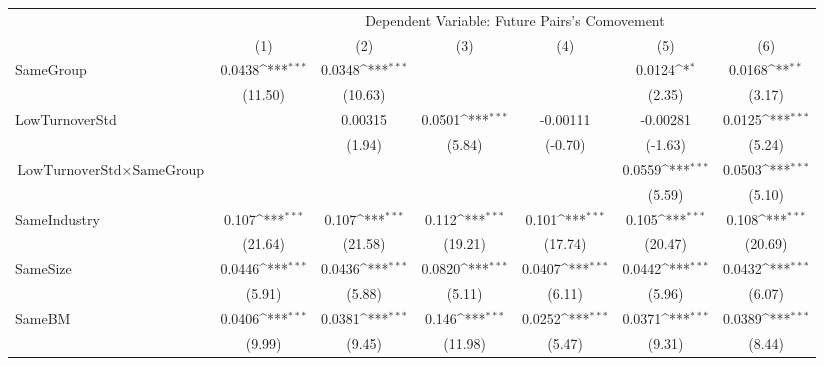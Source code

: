 {
\def\sym#1{\ifmmode^{#1}\else\(^{#1}\)\fi}
\begin{tabular}{l*{6}{c}}
\hline\hline
                &\multicolumn{6}{c}{Dependent Variable:  Future Pairs's Comovement}                                               \\\cmidrule(lr){2-7}
                &\multicolumn{1}{c}{(1)}         &\multicolumn{1}{c}{(2)}         &\multicolumn{1}{c}{(3)}         &\multicolumn{1}{c}{(4)}         &\multicolumn{1}{c}{(5)}         &\multicolumn{1}{c}{(6)}         \\
\hline
SameGroup       &   0.0438\sym{***}&   0.0348\sym{***}&                  &                  &   0.0124\sym{*}  &   0.0168\sym{**} \\
                &  (11.50)         &  (10.63)         &                  &                  &   (2.35)         &   (3.17)         \\
[1em]
LowTurnoverStd  &                  &  0.00315         &   0.0501\sym{***}& -0.00111         & -0.00281         &   0.0125\sym{***}\\
                &                  &   (1.94)         &   (5.84)         &  (-0.70)         &  (-1.63)         &   (5.24)         \\
[1em]
$ {\text{LowTurnoverStd} } \times {\text{SameGroup} }  $ &                  &                  &                  &                  &   0.0559\sym{***}&   0.0503\sym{***}\\
                &                  &                  &                  &                  &   (5.59)         &   (5.10)         \\
[1em]
SameIndustry    &    0.107\sym{***}&    0.107\sym{***}&    0.112\sym{***}&    0.101\sym{***}&    0.105\sym{***}&    0.108\sym{***}\\
                &  (21.64)         &  (21.58)         &  (19.21)         &  (17.74)         &  (20.47)         &  (20.69)         \\
[1em]
SameSize        &   0.0446\sym{***}&   0.0436\sym{***}&   0.0820\sym{***}&   0.0407\sym{***}&   0.0442\sym{***}&   0.0432\sym{***}\\
                &   (5.91)         &   (5.88)         &   (5.11)         &   (6.11)         &   (5.96)         &   (6.07)         \\
[1em]
SameBM          &   0.0406\sym{***}&   0.0381\sym{***}&    0.146\sym{***}&   0.0252\sym{***}&   0.0371\sym{***}&   0.0389\sym{***}\\
                &   (9.99)         &   (9.45)         &  (11.98)         &   (5.47)         &   (9.31)         &   (8.44)         \\

\end{tabular}}

